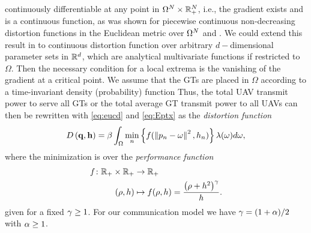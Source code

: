 \documentclass[smallabstract,smallcaptions]{dccpaper}
\newcommand{\disfunction}{distortion function}
\newif\ifarxiv\arxivfalse
\renewcommand{\vp}{\mathbf q}
\newcommand{\df}{\ensuremath{\lam}}         %
\newcommand{\bP}{\ensuremath{\vp}}          %
\newcommand{\bH}{\ensuremath{\vh}}          %
\newcommand{\Pbar}{\ensuremath{\bar{P}}}         %
\newcommand{\Qset}{\ensuremath{\mathcal P}}
\begin{document}
continuously differentiable at any point in $\Omega^N\times {\ensuremath{\mathbb R}}_+^N$, i.e., the gradient exists and is a
continuous function, as was shown for piecewise continuous non-decreasing distortion functions in the Euclidean metric
over $\Omega^N$ \cite[Thm.2.2]{CMB05} and \cite{GJ}. We could extend this result in \cite{WJ18} to continuous \disfunction
over arbitrary $d-$dimensional parameter sets in ${\mathbb R}^d$, which are analytical
multivariate functions  if restricted to $\Omega$.  Then the necessary condition for a local extrema is the vanishing of
the gradient at a critical point\ifarxiv\footnote{Note, if $\nabla \Pbar$ is not continuous in $\Qset^N$ than any jump-point is
a potential critical point and has to be checked individually.}\fi. 
%
  We assume that the GTs  are placed in $\Omega$ according to a time-invariant density (probability) function
    Thus, the total
  UAV transmit power to serve all GTs or the total average GT transmit power to all UAVs can then be rewritten with
  \eqref{eq:eucd} and \eqref{eq:Eptx} as the \emph{distortion function}
  \begin{equation}
    D\left(\bP,\bH\right)=\bet\int_{\Omega}\min_{n} \left\{ f(\Norm{p_n-\ome}^2,h_n) \right\} \df(\omega)d\omega,
   \label{obj0}
  \end{equation}
  where the minimization is over the \emph{performance function}
  \begin{align}
   f \colon {\ensuremath{\mathbb R}}_+\times {\ensuremath{\mathbb R}}_+ &\to {\ensuremath{\mathbb R}}_+\\
             (\rho,h)&\mapsto f(\rho,h)=\frac{\left(\rho+h^2\right)^{\gamma}}{h}.
  \end{align}
  given for a fixed $\gamma\geq 1$. For our communication model we have $\gamma=(1+\alpha)/2$ with $\alpha\geq 1$.
\end{document}
